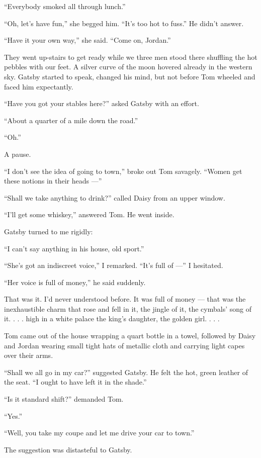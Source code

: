 \documentclass{znotebook}
\begin{document}
``Everybody smoked all through lunch.''

``Oh, let's have fun,'' she begged him. ``It's too hot to fuss.'' He didn't answer.

``Have it your own way,'' she said. ``Come on, Jordan.''

They went up-stairs to get ready while we three men stood there shuffling the hot pebbles with our feet. A silver curve of the moon hovered already in the western sky. Gatsby started to speak, changed his mind, but not before Tom wheeled and faced him expectantly.

``Have you got your stables here?'' asked Gatsby with an effort.

``About a quarter of a mile down the road.''

``Oh.''

A pause.

``I don't see the idea of going to town,'' broke out Tom savagely. ``Women get these notions in their heads ---''

``Shall we take anything to drink?'' called Daisy from an upper window.

``I'll get some whiskey,'' answered Tom. He went inside.

Gatsby turned to me rigidly:

``I can't say anything in his house, old sport.''

``She's got an indiscreet voice,'' I remarked. ``It's full of ---'' I hesitated.

``Her voice is full of money,'' he said suddenly.

That was it. I'd never understood before. It was full of money ---{} that was the inexhaustible charm that rose and fell in it, the jingle of it, the cymbals' song of it. . . . high in a white palace the king's daughter, the golden girl. . . .

Tom came out of the house wrapping a quart bottle in a towel, followed by Daisy and Jordan wearing small tight hats of metallic cloth and carrying light capes over their arms.

``Shall we all go in my car?'' suggested Gatsby. He felt the hot, green leather of the seat. ``I ought to have left it in the shade.''

``Is it standard shift?'' demanded Tom.

``Yes.''

``Well, you take my coupe and let me drive your car to town.''

The suggestion was distasteful to Gatsby.
\end{document}
